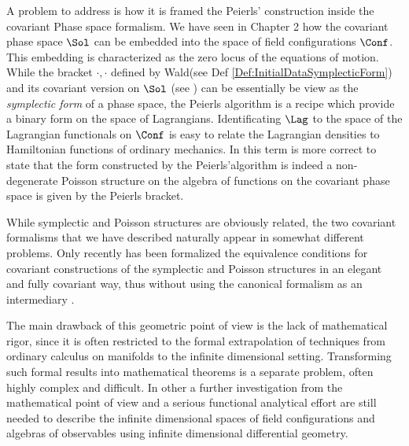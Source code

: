 \documentclass[Main]{subfiles}
\begin{document}
		\vspace{2mm}
		A problem to address is how it is framed the Peierls' construction inside the covariant Phase space formalism.
		We have seen in Chapter 2 how the covariant phase space $\Sol$ can be embedded into the space of field configurations $\Conf$.
			This embedding is characterized as the zero locus of the equations of motion. 
			While the bracket ${\cdot,\cdot}$ defined by Wald\cite{Wald1994}(see Def \ref{Def:InitialDataSymplecticForm}) and its covariant version on $\Sol$ (see \cite{Khavkine2014}) can be essentially be view as the \emph{symplectic form} of a phase space,
			the Peierls algorithm is a recipe which provide a binary form on the space of Lagrangians.
			Identificating $\Lag$ to the space of the Lagrangian functionals on $\Conf$ is easy to relate the Lagrangian densities to Hamiltonian functions of ordinary mechanics.			
			In this term is more correct to state that the form constructed by the Peierls'algorithm is indeed a non-degenerate Poisson structure on the algebra of functions on the covariant phase space is given by the Peierls bracket.
		
			While symplectic and Poisson structures are obviously related, the two covariant formalisms that we have described naturally appear in somewhat different problems. 
			Only recently has been formalized the equivalence conditions for covariant constructions of the symplectic and Poisson structures in an elegant and fully covariant way, thus without using the canonical formalism as an intermediary \cite{Forger2005a}\cite{Khavkine2014}.
				
		The main drawback of this geometric point of view is the lack of mathematical rigor, since it is often restricted to the formal extrapolation of techniques from ordinary calculus on manifolds to the infinite dimensional setting.
		Transforming such formal results into mathematical theorems is a separate problem, often highly complex and difficult.
		In other a further investigation from the mathematical point of view and a serious functional analytical effort are still needed to describe the infinite dimensional spaces of field configurations and algebras of observables using infinite dimensional differential geometry.
\end{document}
